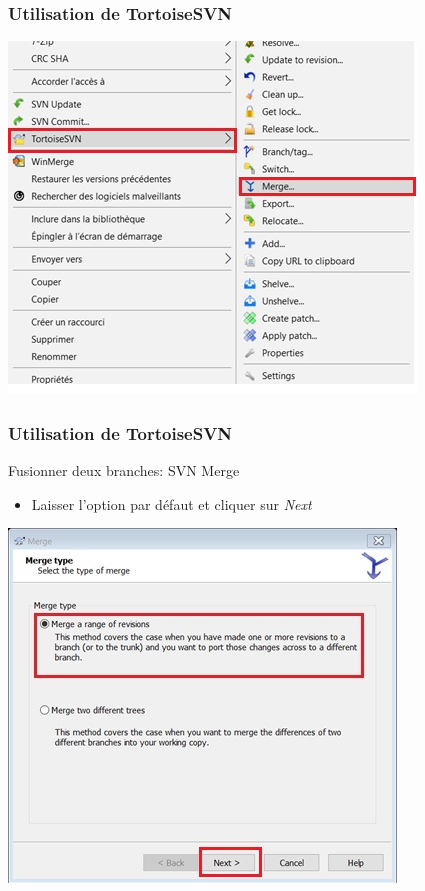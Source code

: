 \documentclass{beamer}
\begin{document}
\begin{frame}
\frametitle{Utilisation de TortoiseSVN}
\includegraphics[scale=1]{../images/merge1.jpg}
\end{frame}

\begin{frame}
\frametitle{Utilisation de TortoiseSVN}
\begin{block}{Fusionner deux branches: SVN Merge}
\begin{itemize}
\item Laisser l'option par défaut et cliquer sur \alert{\textit{Next}}
\end{itemize}
\end{block}
\includegraphics[scale=.7]{../images/merge2.jpg} 
\end{frame}
\end{document}
